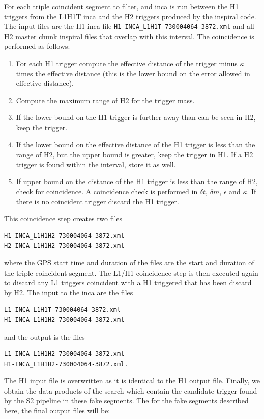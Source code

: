 For each triple coincident segment to filter, and inca is run between the H1
triggers from the L1H1T inca and the H2 triggers produced by the inspiral
code. The input files are the H1 inca file \verb|H1-INCA_L1H1T-730004064-3872.xml|
and all H2 master chunk inspiral files that overlap with this interval. The
coincidence is performed as follows:
\begin{enumerate}
\item For each H1 trigger compute the effective distance of the trigger minus
$\kappa$ times the effective distance (this is the lower bound on the error
allowed in effective distance).

\item Compute the maximum range of H2 for the trigger mass.

\item If the lower bound on the H1 trigger is further away than can be seen in
H2, keep the trigger.

\item If the lower bound on the effective distance of the H1 trigger is less
than the range of H2, but the upper bound is greater, keep the trigger in H1.
If a H2 trigger is found within the interval, store it as well.

\item If upper bound on the distance of the H1 trigger is less than the range
of H2, check for coincidence. A coincidence check is performed in $\delta t$, $\delta m$,
$\epsilon$ and $\kappa$. If there is no coincident trigger discard the H1 trigger.
\end{enumerate}
This coincidence step creates two files
\begin{verbatim}
H1-INCA_L1H1H2-730004064-3872.xml
H2-INCA_L1H1H2-730004064-3872.xml
\end{verbatim}
where the GPS start time and duration of the files are the start and duration
of the triple coincident segment.  The L1/H1 coincidence step is then executed
again to discard any L1 triggers coincident with a H1 triggered that has been
discard by H2. The input to the inca are the files
\begin{verbatim}
L1-INCA_L1H1T-730004064-3872.xml
H1-INCA_L1H1H2-730004064-3872.xml
\end{verbatim}
and the output is the files
\begin{verbatim}
L1-INCA_L1H1H2-730004064-3872.xml
H1-INCA_L1H1H2-730004064-3872.xml.
\end{verbatim}
The H1 input file is overwritten as it is identical to the H1 output file.
Finally, we obtain the data products of the search which contain the candidate
trigger found by the S2 pipeline in these fake segments. The for the fake
segments described here, the final output files will be:

